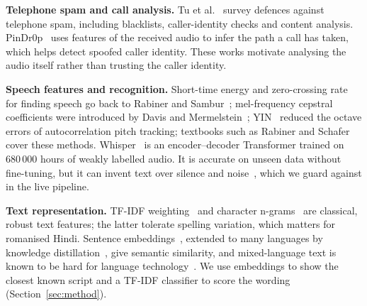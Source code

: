 \documentclass[letterpaper,12pt]{article}
\begin{document}
\textbf{Telephone spam and call analysis.} Tu et al.~\cite{tu2016sok} survey defences against telephone spam, including blacklists, caller-identity checks and content analysis. PinDr0p~\cite{balasubramaniyan2010pindrop} uses features of the received audio to infer the path a call has taken, which helps detect spoofed caller identity. These works motivate analysing the audio itself rather than trusting the caller identity.

\textbf{Speech features and recognition.} Short-time energy and zero-crossing rate for finding speech go back to Rabiner and Sambur~\cite{rabiner1975endpoints}; mel-frequency cepstral coefficients were introduced by Davis and Mermelstein~\cite{davis1980mfcc}; YIN~\cite{decheveigne2002yin} reduced the octave errors of autocorrelation pitch tracking; textbooks such as Rabiner and Schafer~\cite{rabiner2010dsp} cover these methods. Whisper~\cite{radford2023whisper} is an encoder--decoder Transformer trained on 680\,000 hours of weakly labelled audio. It is accurate on unseen data without fine-tuning, but it can invent text over silence and noise~\cite{koenecke2024whisper}, which we guard against in the live pipeline.

\textbf{Text representation.} TF-IDF weighting~\cite{salton1988term} and character n-grams~\cite{cavnar1994ngram} are classical, robust text features; the latter tolerate spelling variation, which matters for romanised Hindi. Sentence embeddings~\cite{reimers2019sbert}, extended to many languages by knowledge distillation~\cite{reimers2020multilingual}, give semantic similarity, and mixed-language text is known to be hard for language technology~\cite{khanuja2020gluecos}. We use embeddings to show the closest known script and a TF-IDF classifier to score the wording (Section~\ref{sec:method}).
\end{document}
